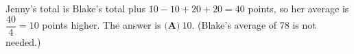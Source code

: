 Jenny's total is Blake's total plus $10-10+20+20=40$ points, so her average is $\dfrac{40}{4}=10$ points higher. The answer is $\boxed{\textbf{(A)}\ 10}$. (Blake's average of $78$ is not needed.)

